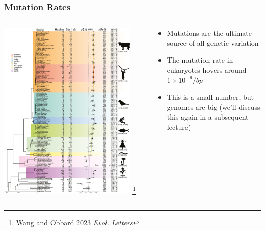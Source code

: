 \documentclass{beamer}
\begin{document}
	\begin{frame}
		\frametitle{Mutation Rates}
		\begin{columns}
			\begin{column}{0.6\textwidth}
		\centering \includegraphics[keepaspectratio, width  =0.9\textwidth]{img/mutationRates} \footnote{Wang and Obbard 2023 \textit{Evol. Letters}}
\end{column}
	\begin{column}{0.4\textwidth}
\begin{itemize}
	\item Mutations are the ultimate source of all genetic variation
	\vspace{10pt}
		\item The mutation rate in eukaryotes hovers around $1\times10^{-9}/bp$
	\vspace{10pt}
	\item This is a small number, but genomes are big (we'll discuss this again in a subsequent lecture)
\end{itemize}
	\end{column}		
	\end{columns}
	\end{frame}
	
\end{document}
